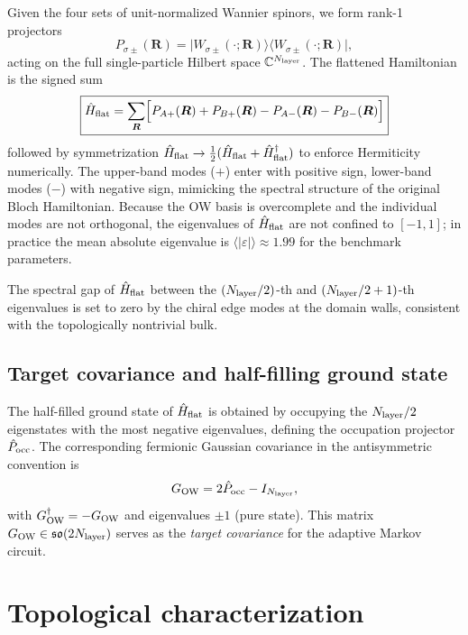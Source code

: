 \documentclass[aps,prb,twocolumn,showpacs,floatfix]{revtex4-2}
\newcommand{\Hflat}{\hat{H}_{\rm flat}}
\newcommand{\Pocc}{\hat{P}_{\rm occ}}
\newcommand{\PAp}{P_{A+}}
\newcommand{\PBp}{P_{B+}}
\newcommand{\PAm}{P_{A-}}
\newcommand{\PBm}{P_{B-}}
\newcommand{\GO}{G_{\rm OW}}
\begin{document}
Given the four sets of unit-normalized Wannier spinors, we form rank-1 projectors
\begin{equation}
P_{\sigma\pm}(\bm{R}) = \bigl|W_{\sigma\pm}(\cdot;\bm{R})\bigr\rangle
\bigl\langle W_{\sigma\pm}(\cdot;\bm{R})\bigr|,
\label{eq:rank1}
\end{equation}
acting on the full single-particle Hilbert space $\mathbb{C}^{N_{\rm layer}}$.
The flattened Hamiltonian is the signed sum
\begin{equation}
\boxed{
\Hflat = \sum_{\bm{R}}
\Bigl[
\PAp(\bm{R}) + \PBp(\bm{R}) - \PAm(\bm{R}) - \PBm(\bm{R})
\Bigr]
}
\label{eq:Hflat}
\end{equation}
followed by symmetrization $\Hflat \to \frac{1}{2}(\Hflat + \Hflat^\dagger)$
to enforce Hermiticity numerically.
The upper-band modes ($+$) enter with positive sign, lower-band modes ($-$) with
negative sign, mimicking the spectral structure of the original Bloch Hamiltonian.
Because the OW basis is overcomplete and the individual modes are not orthogonal,
the eigenvalues of $\Hflat$ are not confined to $[-1, 1]$; in practice the
mean absolute eigenvalue is $\langle|\varepsilon|\rangle \approx 1.99$ for the
benchmark parameters.

The spectral gap of $\Hflat$ between the $(N_{\rm layer}/2)$-th and
$(N_{\rm layer}/2 + 1)$-th eigenvalues is set to zero by the chiral edge modes
at the domain walls, consistent with the topologically nontrivial bulk.

\subsection{Target covariance and half-filling ground state}

The half-filled ground state of $\Hflat$ is obtained by occupying the
$N_{\rm layer}/2$ eigenstates with the most negative eigenvalues,
defining the occupation projector $\Pocc$.
The corresponding fermionic Gaussian covariance in the antisymmetric
convention is
\begin{equation}
\GO = 2\Pocc - I_{N_{\rm layer}},
\label{eq:G_OW}
\end{equation}
with $\GO^\dagger = -\GO$ and eigenvalues $\pm 1$ (pure state).
This matrix $\GO \in \mathfrak{so}(2 N_{\rm layer})$ serves as the \emph{target
covariance} for the adaptive Markov circuit.

\section{Topological characterization}
\label{sec:chern}
\end{document}
